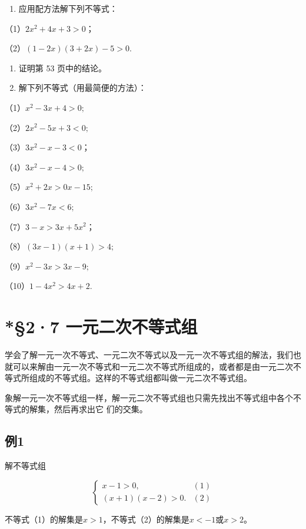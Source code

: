 \begin{enumerate}
\item
  应用配方法解下列不等式：
\end{enumerate}

（1）\(2x^{2} + 4x + 3 > 0\)；

（2）\((1 - 2x)(3 + 2x) - 5 > 0.\)

\begin{enumerate}[start=3]
\item
  证明第 53 页中的结论。
\item
  解下列不等式（用最简便的方法）：
\end{enumerate}

（1）\(x^{2} - 3x + 4 > 0;\)

（2）\(2x^{2}-5x+3<0;\)

（3）\(3x^{2} - x - 3 < 0\)；

（4）\(3x^{2} - x - 4 > 0;\)

（5）\(x^{2} + 2x > 0x - 15;\)

（6）\(3x^{2} - 7x < 6;\)

（7）\(3 - x > 3x + 5x^{2}\)；

（8）\((3x - 1)(x + 1) > 4;\)

（9）\(x^{2} - 3x > 3x - 9;\)

（10）\(1 - 4x^{2} > 4x + 2.\)

\section{*§2·7 一元二次不等式组}

学会了解一元一次不等式、一元二次不等式以及一元一次不等式组的解法，我们也就可以来解由一元一次不等式和一元二次不等式所组成的，或者都是由一元二次不等式所组成的不等式组。这样的不等式组都叫做一元二次不等式组。

象解一元一次不等式组一样，解一元二次不等式组也只需先找出不等式组中各个不等式的解集，然后再求出它
们的交集。

\subsection{例1}

解不等式组

\[
\left\{ \begin{array}{ll} x - 1 > 0, & (1) \\ (x + 1) (x - 2) > 0. & (2) \end{array} \right.
\]

不等式（1）的解集是\(x > 1\)，不等式（2）的解集是\(x < -1\)或\(x > 2\)。

